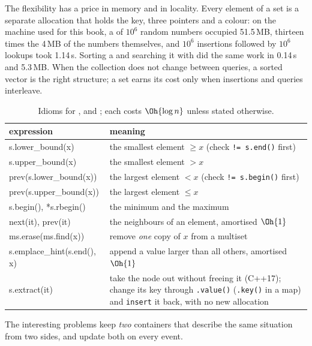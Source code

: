 The flexibility has a price in memory and in locality. Every element of a set is a separate allocation that holds the key, three
pointers and a colour: on the machine used for this book, a  of $10^6$ random numbers occupied 51.5\,MB, thirteen times the
4\,MB of the numbers themselves, and $10^6$ insertions followed by $10^6$ lookups took 1.14\,s. Sorting a  and searching it
with  did the same work in 0.14\,s and 5.3\,MB. When the collection does not change between queries, a sorted vector
is the right structure; a set earns its cost only when insertions and queries interleave.

\begin{table}[htbp]
\centering\small
\begin{tabularx}{\linewidth}{@{}>{\ttfamily\raggedright\arraybackslash}p{5.6cm}X@{}}
\toprule
\normalfont expression & \normalfont meaning \\
\midrule
*s.lower\_bound(x) & the smallest element $\ge x$ (check \texttt{!= s.end()} first) \\
*s.upper\_bound(x) & the smallest element $> x$ \\
*prev(s.lower\_bound(x)) & the largest element $< x$ (check \texttt{!= s.begin()} first) \\
*prev(s.upper\_bound(x)) & the largest element $\le x$ \\
*s.begin(), *s.rbegin() & the minimum and the maximum \\
next(it), prev(it) & the neighbours of an element, amortised $\Oh{1}$ \\
ms.erase(ms.find(x)) & remove \emph{one} copy of $x$ from a multiset \\
s.emplace\_hint(s.end(), x) & append a value larger than all others, amortised $\Oh{1}$ \\
s.extract(it) & take the node out without freeing it (C++17); change its key through \texttt{.value()} (\texttt{.key()} in a
  map) and \texttt{insert} it back, with no new allocation \\
\bottomrule
\end{tabularx}
\caption{Idioms for ,  and ; each costs $\Oh{\log n}$ unless stated otherwise.}
\label{tab:setops}
\end{table}

The interesting problems keep \emph{two} containers that describe the same situation from two sides, and update both on every event.

